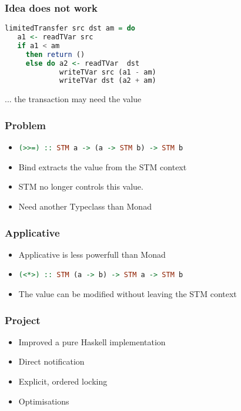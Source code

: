 \documentclass{beamer}
\begin{document}
  \begin{frame}[fragile]
   \frametitle{Idea does not work}
   \begin{lstlisting}[language=Haskell]
limitedTransfer src dst am = do
   a1 <- readTVar src
   if a1 < am
     then return ()
     else do a2 <- readTVar  dst
             writeTVar src (a1 - am)
             writeTVar dst (a2 + am)
   \end{lstlisting}
   \vfill
    ... the transaction may need the value
\end{frame}

  \begin{frame}[fragile]
   \frametitle{Problem}
      \begin{itemize}\setlength\itemsep{1em}
       \item\lstinline[language=Haskell]{(>>=) :: STM a -> (a -> STM b) -> STM b}
       \item Bind extracts the value from the STM context
       \item STM no longer controls this value.
       \item Need another Typeclass than Monad
      \end{itemize}
\end{frame}


  \begin{frame}[fragile]
   \frametitle{Applicative}
      \begin{itemize}\setlength\itemsep{1em}
       \item Applicative is less powerfull than Monad
       \item\lstinline[language=Haskell]{(<*>) :: STM (a -> b) -> STM a -> STM b}
       \item The value can be modified without leaving the STM context
      \end{itemize}
\end{frame}

  
  \begin{frame}
   \frametitle{Project}
   \begin{itemize}\setlength\itemsep{1em}
    \item Improved a pure Haskell implementation
    \item Direct notification
    \item Explicit, ordered locking
    \item Optimisations
   \end{itemize}
  \end{frame}
\end{document}
